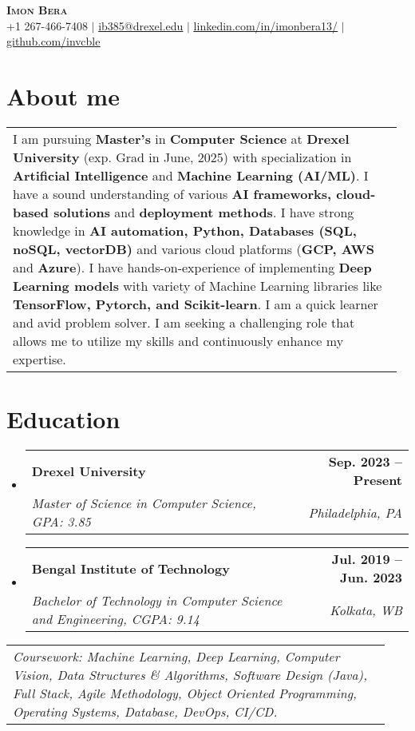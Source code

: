 \documentclass[letterpaper,10pt]{article}
\makeatletter
\newcommand{\resumeSubheading}[4]{
  \vspace{0pt}\item
    \begin{tabular*}{0.97\textwidth}[t]{l@{\extracolsep{\fill}}r}
      \textbf{#1} & \textbf{#2} \\
      \textit{\small#3} & \textit{\small #4} \\
    \end{tabular*}\vspace{-10pt}
}
\newcommand{\resumeSubHeadingListStart}{\begin{itemize}[leftmargin=0.15in, label={}]}
\newcommand{\resumeSubHeadingListEnd}{\end{itemize}}
\makeatother
\begin{document}
\begin{center}
    \textbf{\Huge \scshape Imon Bera} \\ \vspace{1pt}
    \small +1 267-466-7408 $|$ 
    \href{mailto:ib385@drexel.edu}{ib385@drexel.edu} $|$ 
    \href{https://www.linkedin.com/in/imonbera13/}{\underline{linkedin.com/in/imonbera13/}} $|$
    \href{https://github.com/invcble}{\underline{github.com/invcble}\vspace{-10pt}}
\end{center}

\section{About me}
  \vspace{0.2em}
    \hspace{0.15in}\begin{tabular}{p{0.97\linewidth}}
    I am pursuing \textbf{Master’s} in \textbf{Computer Science} at \textbf{Drexel University} (exp. Grad in June, 2025) with specialization in \textbf{Artificial Intelligence} and \textbf{Machine Learning (AI/ML)}. I have a sound understanding of various \textbf{AI frameworks, cloud-based solutions} and \textbf{deployment methods}. I have strong knowledge in \textbf{AI automation, Python, Databases (SQL, noSQL, vectorDB)} and various cloud platforms (\textbf{GCP, AWS} and \textbf{Azure}). I have hands-on-experience of implementing \textbf{Deep Learning models} with variety of Machine Learning libraries like \textbf{TensorFlow, Pytorch, and Scikit-learn}. I am a quick learner and avid problem solver. I am seeking a challenging role that allows me to utilize my skills and continuously enhance my expertise.
\end{tabular}

\section{Education}
\resumeSubHeadingListStart
  \resumeSubheading
    {Drexel University}{Sep. 2023 -- Present}
    {Master of Science in Computer Science, GPA: 3.85}{Philadelphia, PA}
  \resumeSubheading
    {Bengal Institute of Technology}{Jul. 2019 -- Jun. 2023}
    {Bachelor of Technology in Computer Science and Engineering, CGPA: 9.14}{Kolkata, WB}
\resumeSubHeadingListEnd

  \vspace{0.2em}
    \hspace{0.15in}\begin{tabular}{p{0.94\linewidth}}
    \textit{{Coursework}: Machine Learning, Deep Learning, Computer Vision, Data Structures \& Algorithms, Software Design (Java), Full Stack, Agile Methodology, Object Oriented Programming, Operating Systems, Database, DevOps, CI/CD.}
\end{tabular}
\end{document}
